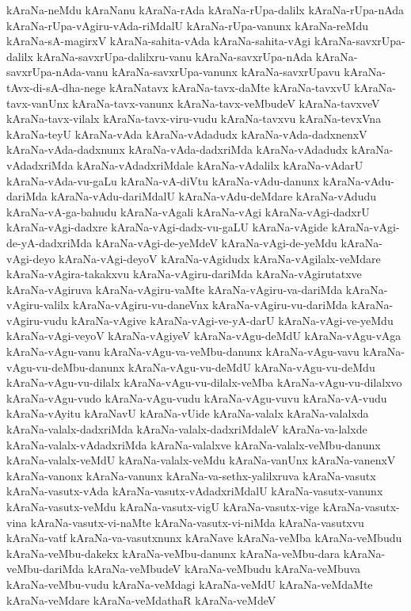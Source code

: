 {kAraNa-neMdu
kAraNanu
kAraNa-rAda
kAraNa-rUpa-dalilx
kAraNa-rUpa-nAda
kAraNa-rUpa-vAgiru-vAda-riMdalU
kAraNa-rUpa-vanunx
kAraNa-reMdu
kAraNa-sA-magirxV
kAraNa-sahita-vAda
kAraNa-sahita-vAgi
kAraNa-savxrUpa-dalilx
kAraNa-savxrUpa-dalilxru-vanu
kAraNa-savxrUpa-nAda
kAraNa-savxrUpa-nAda-vanu
kAraNa-savxrUpa-vanunx
kAraNa-savxrUpavu
kAraNa-tAvx-di-sA-dha-nege
kAraNatavx
kAraNa-tavx-daMte
kAraNa-tavxvU
kAraNa-tavx-vanUnx
kAraNa-tavx-vanunx
kAraNa-tavx-veMbudeV
kAraNa-tavxveV
kAraNa-tavx-vilalx
kAraNa-tavx-viru-vudu
kAraNa-tavxvu
kAraNa-tevxVna
kAraNa-teyU
kAraNa-vAda
kAraNa-vAdadudx
kAraNa-vAda-dadxnenxV
kAraNa-vAda-dadxnunx
kAraNa-vAda-dadxriMda
kAraNa-vAdadudx
kAraNa-vAdadxriMda
kAraNa-vAdadxriMdale
kAraNa-vAdalilx
kAraNa-vAdarU
kAraNa-vAda-vu-gaLu
kAraNa-vA-diVtu
kAraNa-vAdu-danunx
kAraNa-vAdu-dariMda
kAraNa-vAdu-dariMdalU
kAraNa-vAdu-deMdare
kAraNa-vAdudu
kAraNa-vA-ga-bahudu
kAraNa-vAgali
kAraNa-vAgi
kAraNa-vAgi-dadxrU
kAraNa-vAgi-dadxre
kAraNa-vAgi-dadx-vu-gaLU
kAraNa-vAgide
kAraNa-vAgi-de-yA-dadxriMda
kAraNa-vAgi-de-yeMdeV
kAraNa-vAgi-de-yeMdu
kAraNa-vAgi-deyo
kAraNa-vAgi-deyoV
kAraNa-vAgidudx
kAraNa-vAgilalx-veMdare
kAraNa-vAgira-takakxvu
kAraNa-vAgiru-dariMda
kAraNa-vAgirutatxve
kAraNa-vAgiruva
kAraNa-vAgiru-vaMte
kAraNa-vAgiru-va-dariMda
kAraNa-vAgiru-valilx
kAraNa-vAgiru-vu-daneVnx
kAraNa-vAgiru-vu-dariMda
kAraNa-vAgiru-vudu
kAraNa-vAgive
kAraNa-vAgi-ve-yA-darU
kAraNa-vAgi-ve-yeMdu
kAraNa-vAgi-veyoV
kAraNa-vAgiyeV
kAraNa-vAgu-deMdU
kAraNa-vAgu-vAga
kAraNa-vAgu-vanu
kAraNa-vAgu-va-veMbu-danunx
kAraNa-vAgu-vavu
kAraNa-vAgu-vu-deMbu-danunx
kAraNa-vAgu-vu-deMdU
kAraNa-vAgu-vu-deMdu
kAraNa-vAgu-vu-dilalx
kAraNa-vAgu-vu-dilalx-veMba
kAraNa-vAgu-vu-dilalxvo
kAraNa-vAgu-vudo
kAraNa-vAgu-vudu
kAraNa-vAgu-vuvu
kAraNa-vA-vudu
kAraNa-vAyitu
kAraNavU
kAraNa-vUide
kAraNa-valalx
kAraNa-valalxda
kAraNa-valalx-dadxriMda
kAraNa-valalx-dadxriMdaleV
kAraNa-va-lalxde
kAraNa-valalx-vAdadxriMda
kAraNa-valalxve
kAraNa-valalx-veMbu-danunx
kAraNa-valalx-veMdU
kAraNa-valalx-veMdu
kAraNa-vanUnx
kAraNa-vanenxV
kAraNa-vanonx
kAraNa-vanunx
kAraNa-va-sethx-yalilxruva
kAraNa-vasutx
kAraNa-vasutx-vAda
kAraNa-vasutx-vAdadxriMdalU
kAraNa-vasutx-vanunx
kAraNa-vasutx-veMdu
kAraNa-vasutx-vigU
kAraNa-vasutx-vige
kAraNa-vasutx-vina
kAraNa-vasutx-vi-naMte
kAraNa-vasutx-vi-niMda
kAraNa-vasutxvu
kAraNa-vatf
kAraNa-va-vasutxnunx
kAraNave
kAraNa-veMba
kAraNa-veMbudu
kAraNa-veMbu-dakekx
kAraNa-veMbu-danunx
kAraNa-veMbu-dara
kAraNa-veMbu-dariMda
kAraNa-veMbudeV
kAraNa-veMbudu
kAraNa-veMbuva
kAraNa-veMbu-vudu
kAraNa-veMdagi
kAraNa-veMdU
kAraNa-veMdaMte
kAraNa-veMdare
kAraNa-veMdathaR
kAraNa-veMdeV
}
